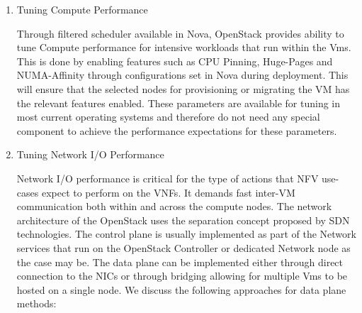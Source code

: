 \begin{enumerate}

\item Tuning Compute Performance

\begin{flushleft}
Through filtered scheduler available in Nova, OpenStack provides ability to tune Compute performance for intensive workloads that run within the Vms. This is done by enabling features such as CPU Pinning, Huge-Pages and NUMA-Affinity through configurations set in Nova during deployment. This will ensure that the selected nodes for provisioning or migrating the VM has the relevant features enabled. These parameters are available for tuning in most current operating systems and therefore do not need any special component to achieve the performance expectations for these parameters.
\end{flushleft}

\item Tuning Network I/O Performance

\begin{flushleft}
Network I/O performance is critical for the type of actions that NFV use-cases expect to perform on the VNFs. It demands fast inter-VM communication both within and across the compute nodes. 
The network architecture of the OpenStack uses the separation concept proposed by SDN technologies. The control plane is usually implemented as part of the Network services that run on the OpenStack Controller or dedicated Network node as the case may be. The data plane can be implemented either through direct connection to the NICs or through bridging allowing for multiple Vms to be hosted on a single node. We discuss the following approaches for data plane methods:
\end{flushleft}
		

\end{enumerate}
